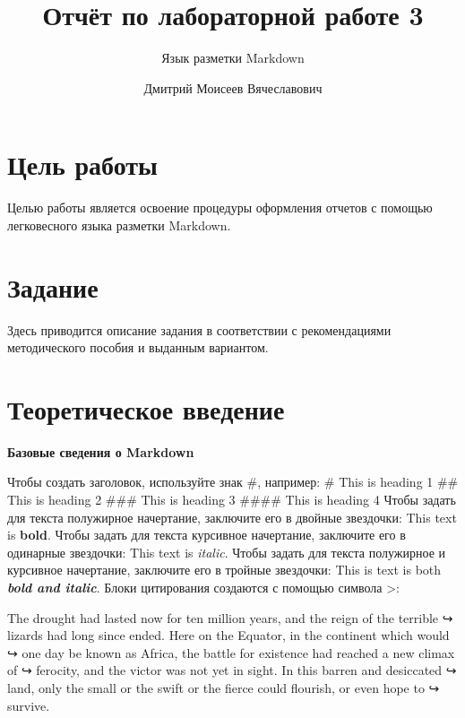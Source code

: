 \documentclass[
  english,
  russian,
  12pt,
  a4paper,
  DIV=11,
  numbers=noendperiod]{scrreprt}
\title{Отчёт по лабораторной работе 3}
\subtitle{Язык разметки Markdown}
\author{Дмитрий Моисеев Вячеславович}
\date{}
\renewcommand*\contentsname{Содержание}
\newcommand\contentsname{Содержание}
\begin{document}
\maketitle

\renewcommand*\contentsname{Содержание}
{
\setcounter{tocdepth}{1}
\tableofcontents
}
\listoffigures
\listoftables

\chapter{Цель
работы}\label{ux446ux435ux43bux44c-ux440ux430ux431ux43eux442ux44b}

Целью работы является освоение процедуры оформления отчетов с помощью
легковесного языка разметки Markdown.

\chapter{Задание}\label{ux437ux430ux434ux430ux43dux438ux435}

Здесь приводится описание задания в соответствии с рекомендациями
методического пособия и выданным вариантом.

\chapter{Теоретическое
введение}\label{ux442ux435ux43eux440ux435ux442ux438ux447ux435ux441ux43aux43eux435-ux432ux432ux435ux434ux435ux43dux438ux435}

\textbf{Базовые сведения о Markdown}

Чтобы создать заголовок, используйте знак \#, например: \# This is
heading 1 \#\# This is heading 2 \#\#\# This is heading 3 \#\#\#\# This
is heading 4 Чтобы задать для текста полужирное начертание, заключите
его в двойные звездочки: This text is \textbf{bold}. Чтобы задать для
текста курсивное начертание, заключите его в одинарные звездочки: This
text is \emph{italic}. Чтобы задать для текста полужирное и курсивное
начертание, заключите его в тройные звездочки: This is text is both
\textbf{\emph{bold and italic}}. Блоки цитирования создаются с помощью
символа \textgreater:

\begin{displayquote}
The drought had lasted now for ten million years, and the reign of the
terrible ↪ lizards had long since ended. Here on the Equator, in the
continent which would ↪ one day be known as Africa, the battle for
existence had reached a new climax of ↪ ferocity, and the victor was not
yet in sight. In this barren and desiccated ↪ land, only the small or
the swift or the fierce could flourish, or even hope to ↪ survive.
\end{displayquote}
\end{document}
